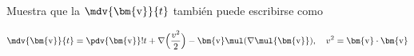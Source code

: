 \documentclass[../main.tex]{subfiles}
\begin{document}
\begin{problema}
	Muestra que la \(\mdv{\bm{\mathrm{v}}}{t}\) también puede escribirse como

	\begin{equation*}
		\mdv{\bm{\mathrm{v}}}{t} = \pdv{\bm{\mathrm{v}}}!{t} + \nabla{\Bigl(\dfrac{v^{2}}{2}\Bigr)}
		- \bm{\mathrm{v}} \mul (\nabla \mul{\bm{\mathrm{v}}}),\quad v^{2} = \bm{\mathrm{v}} \cdot \bm{\mathrm{v}}
	\end{equation*}
\end{problema}
\end{document}
